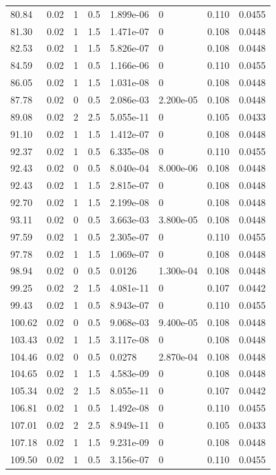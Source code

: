 \documentclass[preview]{standalone}
\begin{document}
{{{\begin{tabular}{L{1.2cm}C{1.2cm} C{0.3cm}C{0.5cm} C{1.4cm}C{1.4cm} C{1.4cm}C{1.4cm}}
  80.84  &  0.02  & 1     & 0.5 &  1.899e-06  & 0  & 0.110 &  0.0455   \\ 
  81.30  &  0.02  & 1     & 1.5 &  1.471e-07  & 0  & 0.108 &  0.0448   \\ 
  82.53  &  0.02  & 1     & 1.5 &  5.826e-07  & 0  & 0.108 &  0.0448   \\ 
  84.59  &  0.02  & 1     & 0.5 &  1.166e-06  & 0  & 0.110 &  0.0455   \\ 
  86.05  &  0.02  & 1     & 1.5 &  1.031e-08  & 0  & 0.108 &  0.0448   \\ 
  87.78  &  0.02  & 0     & 0.5 &  2.086e-03  & 2.200e-05  & 0.108 &  0.0448   \\ 
  89.08  &  0.02  & 2     & 2.5 &  5.055e-11  & 0  & 0.105 &  0.0433   \\ 
  91.10  &  0.02  & 1     & 1.5 &  1.412e-07  & 0  & 0.108 &  0.0448   \\ 
  92.37  &  0.02  & 1     & 0.5 &  6.335e-08  & 0  & 0.110 &  0.0455   \\ 
  92.43  &  0.02  & 0     & 0.5 &  8.040e-04  & 8.000e-06  & 0.108 &  0.0448   \\ 
  92.43  &  0.02  & 1     & 1.5 &  2.815e-07  & 0  & 0.108 &  0.0448   \\ 
  92.70  &  0.02  & 1     & 1.5 &  2.199e-08  & 0  & 0.108 &  0.0448   \\ 
  93.11  &  0.02  & 0     & 0.5 &  3.663e-03  & 3.800e-05  & 0.108 &  0.0448   \\ 
  97.59  &  0.02  & 1     & 0.5 &  2.305e-07  & 0  & 0.110 &  0.0455   \\ 
  97.78  &  0.02  & 1     & 1.5 &  1.069e-07  & 0  & 0.108 &  0.0448   \\ 
  98.94  &  0.02  & 0     & 0.5 &  0.0126  & 1.300e-04  & 0.108 &  0.0448   \\ 
  99.25  &  0.02  & 2     & 1.5 &  4.081e-11  & 0  & 0.107 &  0.0442   \\ 
  99.43  &  0.02  & 1     & 0.5 &  8.943e-07  & 0  & 0.110 &  0.0455   \\ 
  100.62  &  0.02  & 0     & 0.5 &  9.068e-03  & 9.400e-05  & 0.108 &  0.0448   \\ 
  103.43  &  0.02  & 1     & 1.5 &  3.117e-08  & 0  & 0.108 &  0.0448   \\ 
  104.46  &  0.02  & 0     & 0.5 &  0.0278  & 2.870e-04  & 0.108 &  0.0448   \\ 
  104.65  &  0.02  & 1     & 1.5 &  4.583e-09  & 0  & 0.108 &  0.0448   \\ 
  105.34  &  0.02  & 2     & 1.5 &  8.055e-11  & 0  & 0.107 &  0.0442   \\ 
  106.81  &  0.02  & 1     & 0.5 &  1.492e-08  & 0  & 0.110 &  0.0455   \\ 
  107.01  &  0.02  & 2     & 2.5 &  8.949e-11  & 0  & 0.105 &  0.0433   \\ 
  107.18  &  0.02  & 1     & 1.5 &  9.231e-09  & 0  & 0.108 &  0.0448   \\ 
  109.50  &  0.02  & 1     & 0.5 &  3.156e-07  & 0  & 0.110 &  0.0455   \\ 
\hline 
\end{tabular} 

}}}
\end{document}
